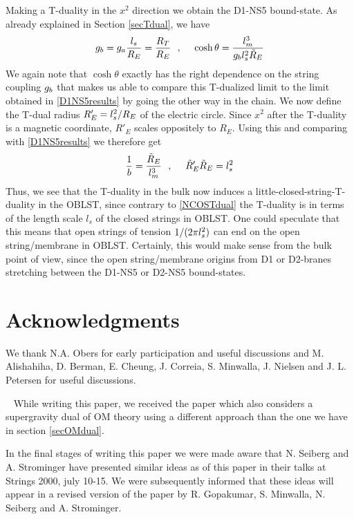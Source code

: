 \documentclass[a4paper,twoside,titlepage,12pt]{article}
\begin{document}
Making a T-duality in the $x^2$ direction we obtain the D1-NS5 
bound-state. As already explained in Section \ref{secTdual}, we have
%
\begin{equation}
g_b = g_a \frac{l_s}{R_E} = \frac{R_T}{R_E} \ \ ,\ \ \ \ 
\cosh \theta = \frac{l_m^3}{g_b l_s^2 \tilde{R}_E }
\end{equation}
%
We again note that $\cosh \theta$ exactly has the right dependence
on the string coupling $g_b$ that makes us able to compare this
T-dualized limit to the limit obtained in \eqref{D1NS5results}
by going the other way in the chain.
We now define the T-dual radius \( R'_E = l_s^2 / R_E \) 
of the electric circle. Since \( x^2 \) after the T-duality
is a magnetic coordinate, $R'_E$ scales oppositely to $R_E$.
Using this and comparing with \eqref{D1NS5results} we therefore get
%
\begin{equation}
\frac{1}{b} = \frac{\tilde{R}_E}{l_m^3} \ \ ,\ \ \ \ 
\tilde{R}'_E \tilde{R}_E = l_s^2
\end{equation}
%
Thus, we see that the T-duality in the bulk now induces a 
little-closed-string-T-duality in the OBLST, since contrary to
\eqref{NCOSTdual} the T-duality is in terms of the 
length scale $l_s$ of the closed strings in OBLST.
One could speculate that this means that open strings of tension
$1/(2\pi l_s^2)$ can end on the open string/membrane
in OBLST. 
Certainly, this would make sense from the bulk point of view, since
the open string/membrane origins from D1 or D2-branes stretching
between the D1-NS5 or D2-NS5 bound-states. 



\section*{Acknowledgments}

We thank N.A. Obers for early participation and useful discussions
and M. Alishahiha, D. Berman, E. Cheung, J. Correia, S. Minwalla, J. Nielsen 
and J. L. Petersen for useful discussions.

\  \newline
While writing this paper, we received the paper \cite{Berman:2000zw}
which also considers a supergravity dual of OM theory
using a different approach than the one we have in
section \ref{secOMdual}.

In the final stages of writing this paper we were 
made aware that N. Seiberg and A. Strominger have presented
similar ideas as of this paper in their talks at Strings 2000, july 10-15.
We were subsequently informed that these ideas will appear in
a revised version of the paper \cite{Gopakumar:2000ep} 
by R. Gopakumar, S. Minwalla, N. Seiberg and A. Strominger.
\end{document}

